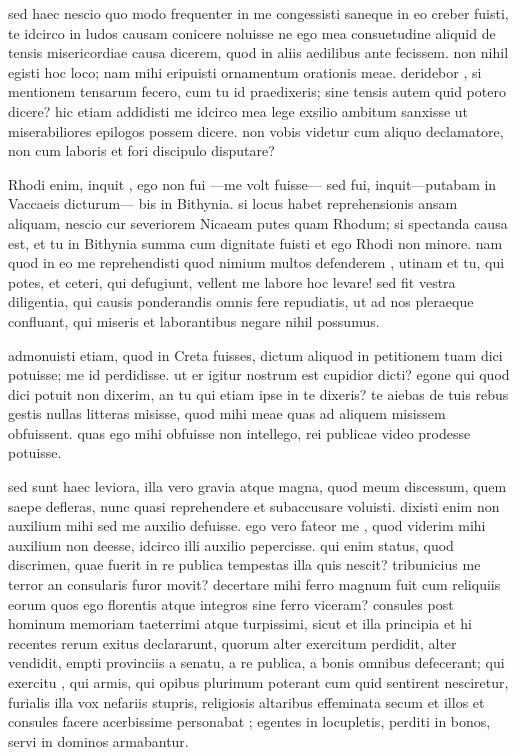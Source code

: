  sed haec nescio quo modo frequenter in me congessisti saneque in eo creber fuisti, te idcirco in ludos causam conicere noluisse ne ego mea consuetudine aliquid de tensis misericordiae causa dicerem, quod in aliis aedilibus ante fecissem. non nihil egisti hoc loco; nam mihi eripuisti ornamentum orationis meae. deridebor , si mentionem tensarum fecero, cum tu id praedixeris; sine tensis autem quid potero dicere? hic etiam addidisti me idcirco mea lege exsilio ambitum sanxisse ut miserabiliores epilogos possem dicere. non vobis videtur cum aliquo declamatore, non cum laboris et fori discipulo disputare?

 Rhodi enim, inquit , ego non fui —me volt fuisse— sed fui, inquit—putabam in Vaccaeis dicturum— bis in Bithynia. si locus habet reprehensionis ansam aliquam, nescio cur severiorem Nicaeam putes quam Rhodum; si spectanda causa est, et tu in Bithynia summa cum dignitate fuisti et ego Rhodi non minore. nam quod in eo me reprehendisti quod nimium multos defenderem , utinam et tu, qui potes, et ceteri, qui defugiunt, vellent me labore hoc levare! sed fit vestra diligentia, qui causis ponderandis omnis fere repudiatis, ut ad nos pleraeque confluant, qui miseris et laborantibus negare nihil possumus.

 admonuisti etiam, quod in Creta fuisses, dictum aliquod in petitionem tuam dici potuisse; me id perdidisse. ut er igitur nostrum est cupidior dicti? egone qui quod dici potuit non dixerim, an tu qui etiam ipse in te dixeris? te aiebas de tuis rebus gestis nullas litteras misisse, quod mihi meae quas ad aliquem misissem obfuissent. quas ego mihi obfuisse non intellego, rei publicae video prodesse potuisse.

 sed sunt haec leviora, illa vero gravia atque magna, quod meum discessum, quem saepe defleras, nunc quasi reprehendere et subaccusare voluisti. dixisti enim non auxilium mihi sed me auxilio defuisse. ego vero fateor me , quod viderim mihi auxilium non deesse, idcirco illi auxilio pepercisse. qui enim status, quod discrimen, quae fuerit in re publica tempestas illa quis nescit? tribunicius me terror an consularis furor movit? decertare mihi ferro magnum fuit cum reliquiis eorum quos ego florentis atque integros sine ferro viceram? consules post hominum memoriam taeterrimi atque turpissimi, sicut et illa principia et hi recentes rerum exitus declararunt, quorum alter exercitum perdidit, alter vendidit, empti provinciis a senatu, a re publica, a bonis omnibus defecerant; qui exercitu , qui armis, qui opibus plurimum poterant cum quid sentirent nesciretur, furialis illa vox nefariis stupris, religiosis altaribus effeminata secum et illos et consules facere acerbissime personabat ; egentes in locupletis, perditi in bonos, servi in dominos armabantur.

